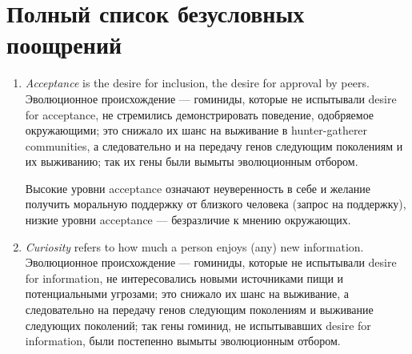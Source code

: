 \documentclass[11pt]{article}
\theoremstyle{remark}
\theoremstyle{definition}
\begin{document}
\section{Полный список безусловных поощрений}















\begin{enumerate}

\item \textit{Acceptance} is the desire for inclusion, the desire for approval by peers. Эволюционное происхождение --- гоминиды, которые не испытывали desire for acceptance, не стремились демонстрировать поведение, одобряемое окружающими; это снижало их шанс на выживание в hunter-gatherer communities, а следовательно и на передачу генов следующим поколениям и их выживанию; так их гены были вымыты эволюционным отбором.









Высокие уровни acceptance означают неуверенность в себе и желание получить моральную поддержку от близкого человека (запрос на поддержку), низкие уровни acceptance --- безразличие к мнению окружающих.








\item \textit{Curiosity} refers to how much a person enjoys (any) new information. Эволюционное происхождение --- гоминиды, которые не испытывали desire for information, не интересовались новыми источниками пищи и потенциальными угрозами; это снижало их шанс на выживание, а следовательно на передачу генов следующим поколениям и выживание следующих поколений; так гены гоминид, не испытывавших desire for information, были постепенно вымыты эволюционным отбором. 



\end{enumerate}
\end{document}
